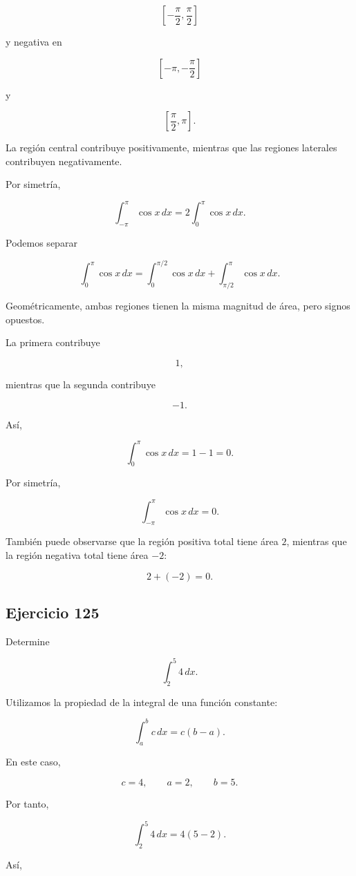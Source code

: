 \documentclass[12pt]{article}
\begin{document}
\[
\left[-\frac{\pi}{2},\frac{\pi}{2}\right]
\]

y negativa en

\[
\left[-\pi,-\frac{\pi}{2}\right]
\]

y

\[
\left[\frac{\pi}{2},\pi\right].
\]

La región central contribuye positivamente, mientras que las regiones
laterales contribuyen negativamente.

Por simetría,

\[
\int_{-\pi}^{\pi}\cos x\,dx
=
2\int_0^\pi\cos x\,dx.
\]

Podemos separar

\[
\int_0^\pi\cos x\,dx
=
\int_0^{\pi/2}\cos x\,dx
+
\int_{\pi/2}^\pi\cos x\,dx.
\]

Geométricamente, ambas regiones tienen la misma magnitud de área, pero
signos opuestos.

La primera contribuye

\[
1,
\]

mientras que la segunda contribuye

\[
-1.
\]

Así,

\[
\int_0^\pi\cos x\,dx=1-1=0.
\]

Por simetría,

\[
\boxed{
\int_{-\pi}^{\pi}\cos x\,dx=0
}.
\]

También puede observarse que la región positiva total tiene área \(2\),
mientras que la región negativa total tiene área \(-2\):

\[
2+(-2)=0.
\]

\subsection*{Ejercicio 125}

Determine

\[
\int_2^5 4\,dx.
\]

Utilizamos la propiedad de la integral de una función constante:

\[
\int_a^b c\,dx
=
c(b-a).
\]

En este caso,

\[
c=4,
\qquad
a=2,
\qquad
b=5.
\]

Por tanto,

\[
\int_2^5 4\,dx
=
4(5-2).
\]

Así,
\end{document}
